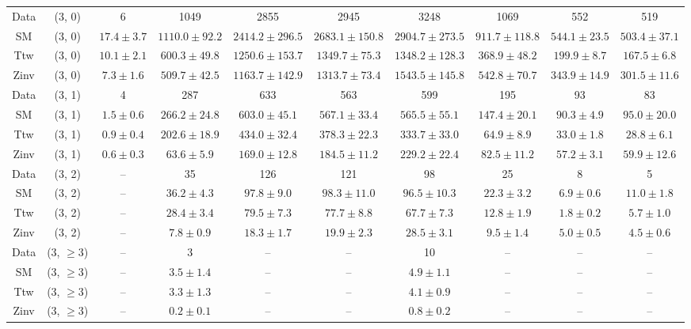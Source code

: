 \begin{table}[h!]
{\begin{tabular}{cccccccccc}
	Data & (3, 0) & 6 & 1049 & 2855 & 2945 & 3248 & 1069 & 552 & 519 \\[0.5ex] 
	SM & (3, 0) & $17.4\pm 3.7$ & $1110.0\pm 92.2$ & $2414.2\pm 296.5$ & $2683.1\pm 150.8$ & $2904.7\pm 273.5$ & $911.7\pm 118.8$ & $544.1\pm 23.5$ & $503.4\pm 37.1$ \\[0.5ex] 
	Ttw & (3, 0) & $10.1\pm 2.1$ & $600.3\pm 49.8$ & $1250.6\pm 153.7$ & $1349.7\pm 75.3$ & $1348.2\pm 128.3$ & $368.9\pm 48.2$ & $199.9\pm 8.7$ & $167.5\pm 6.8$ \\[0.5ex] 
	Zinv & (3, 0) & $7.3\pm 1.6$ & $509.7\pm 42.5$ & $1163.7\pm 142.9$ & $1313.7\pm 73.4$ & $1543.5\pm 145.8$ & $542.8\pm 70.7$ & $343.9\pm 14.9$ & $301.5\pm 11.6$ \\[0.5ex] 
	Data & (3, 1) & 4 & 287 & 633 & 563 & 599 & 195 & 93 & 83 \\[0.5ex] 
	SM & (3, 1) & $1.5\pm 0.6$ & $266.2\pm 24.8$ & $603.0\pm 45.1$ & $567.1\pm 33.4$ & $565.5\pm 55.1$ & $147.4\pm 20.1$ & $90.3\pm 4.9$ & $95.0\pm 20.0$ \\[0.5ex] 
	Ttw & (3, 1) & $0.9\pm 0.4$ & $202.6\pm 18.9$ & $434.0\pm 32.4$ & $378.3\pm 22.3$ & $333.7\pm 33.0$ & $64.9\pm 8.9$ & $33.0\pm 1.8$ & $28.8\pm 6.1$ \\[0.5ex] 
	Zinv & (3, 1) & $0.6\pm 0.3$ & $63.6\pm 5.9$ & $169.0\pm 12.8$ & $184.5\pm 11.2$ & $229.2\pm 22.4$ & $82.5\pm 11.2$ & $57.2\pm 3.1$ & $59.9\pm 12.6$ \\[0.5ex] 
	Data & (3, 2) & -- & 35 & 126 & 121 & 98 & 25 & 8 & 5 \\[0.5ex] 
	SM & (3, 2) & -- & $36.2\pm 4.3$ & $97.8\pm 9.0$ & $98.3\pm 11.0$ & $96.5\pm 10.3$ & $22.3\pm 3.2$ & $6.9\pm 0.6$ & $11.0\pm 1.8$ \\[0.5ex] 
	Ttw & (3, 2) & -- & $28.4\pm 3.4$ & $79.5\pm 7.3$ & $77.7\pm 8.8$ & $67.7\pm 7.3$ & $12.8\pm 1.9$ & $1.8\pm 0.2$ & $5.7\pm 1.0$ \\[0.5ex] 
	Zinv & (3, 2) & -- & $7.8\pm 0.9$ & $18.3\pm 1.7$ & $19.9\pm 2.3$ & $28.5\pm 3.1$ & $9.5\pm 1.4$ & $5.0\pm 0.5$ & $4.5\pm 0.6$ \\[0.5ex] 
	Data & (3, $\ge3$) & -- & 3 & -- & -- & 10 & -- & -- & -- \\[0.5ex] 
	SM & (3, $\ge3$) & -- & $3.5\pm 1.4$ & -- & -- & $4.9\pm 1.1$ & -- & -- & -- \\[0.5ex] 
	Ttw & (3, $\ge3$) & -- & $3.3\pm 1.3$ & -- & -- & $4.1\pm 0.9$ & -- & -- & -- \\[0.5ex] 
	Zinv & (3, $\ge3$) & -- & $0.2\pm 0.1$ & -- & -- & $0.8\pm 0.2$ & -- & -- & -- \\[0.5ex] 

\end{tabular}}
\end{table}

